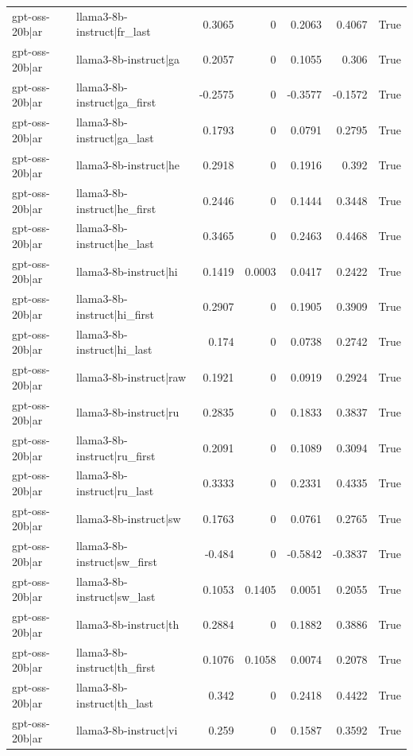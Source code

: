 \begin{table}
\begin{tabular}{l l r r r r l}
gpt-oss-20b|ar & llama3-8b-instruct|fr_last & 0.3065 & 0 & 0.2063 & 0.4067 & True \\
gpt-oss-20b|ar & llama3-8b-instruct|ga & 0.2057 & 0 & 0.1055 & 0.306 & True \\
gpt-oss-20b|ar & llama3-8b-instruct|ga_first & -0.2575 & 0 & -0.3577 & -0.1572 & True \\
gpt-oss-20b|ar & llama3-8b-instruct|ga_last & 0.1793 & 0 & 0.0791 & 0.2795 & True \\
gpt-oss-20b|ar & llama3-8b-instruct|he & 0.2918 & 0 & 0.1916 & 0.392 & True \\
gpt-oss-20b|ar & llama3-8b-instruct|he_first & 0.2446 & 0 & 0.1444 & 0.3448 & True \\
gpt-oss-20b|ar & llama3-8b-instruct|he_last & 0.3465 & 0 & 0.2463 & 0.4468 & True \\
gpt-oss-20b|ar & llama3-8b-instruct|hi & 0.1419 & 0.0003 & 0.0417 & 0.2422 & True \\
gpt-oss-20b|ar & llama3-8b-instruct|hi_first & 0.2907 & 0 & 0.1905 & 0.3909 & True \\
gpt-oss-20b|ar & llama3-8b-instruct|hi_last & 0.174 & 0 & 0.0738 & 0.2742 & True \\
gpt-oss-20b|ar & llama3-8b-instruct|raw & 0.1921 & 0 & 0.0919 & 0.2924 & True \\
gpt-oss-20b|ar & llama3-8b-instruct|ru & 0.2835 & 0 & 0.1833 & 0.3837 & True \\
gpt-oss-20b|ar & llama3-8b-instruct|ru_first & 0.2091 & 0 & 0.1089 & 0.3094 & True \\
gpt-oss-20b|ar & llama3-8b-instruct|ru_last & 0.3333 & 0 & 0.2331 & 0.4335 & True \\
gpt-oss-20b|ar & llama3-8b-instruct|sw & 0.1763 & 0 & 0.0761 & 0.2765 & True \\
gpt-oss-20b|ar & llama3-8b-instruct|sw_first & -0.484 & 0 & -0.5842 & -0.3837 & True \\
gpt-oss-20b|ar & llama3-8b-instruct|sw_last & 0.1053 & 0.1405 & 0.0051 & 0.2055 & True \\
gpt-oss-20b|ar & llama3-8b-instruct|th & 0.2884 & 0 & 0.1882 & 0.3886 & True \\
gpt-oss-20b|ar & llama3-8b-instruct|th_first & 0.1076 & 0.1058 & 0.0074 & 0.2078 & True \\
gpt-oss-20b|ar & llama3-8b-instruct|th_last & 0.342 & 0 & 0.2418 & 0.4422 & True \\
gpt-oss-20b|ar & llama3-8b-instruct|vi & 0.259 & 0 & 0.1587 & 0.3592 & True \\

\end{tabular}
\end{table}

